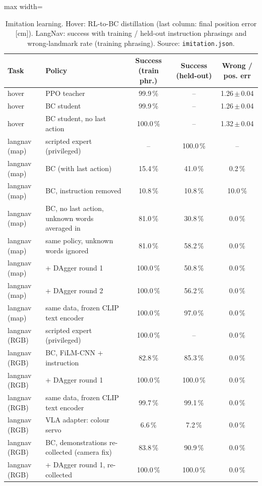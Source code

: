 \begin{table}[!htbp]\centering\small\caption{Imitation learning. Hover: RL-to-BC distillation (last column: final position error [cm]). LangNav: success with training / held-out instruction phrasings and wrong-landmark rate (training phrasing). Source: \texttt{imitation.json}.}\label{tab:fw_il}
\begin{adjustbox}{max width=\linewidth}\begin{tabular}{llccc}\toprule
Task & Policy & Success (train phr.) & Success (held-out) & Wrong / pos. err\\\midrule
hover & PPO teacher & 99.9\,\% & -- & 1.26\,$\pm$\,0.04\\
hover & BC student & 99.9\,\% & -- & 1.26\,$\pm$\,0.04\\
hover & BC student, no last action & 100.0\,\% & -- & 1.32\,$\pm$\,0.04\\
langnav (map) & scripted expert (privileged) & -- & 100.0\,\% & --\\
langnav (map) & BC (with last action) & 15.4\,\% & 41.0\,\% & 0.2\,\%\\
langnav (map) & BC, instruction removed & 10.8\,\% & 10.8\,\% & 10.0\,\%\\
langnav (map) & BC, no last action, unknown words averaged in & 81.0\,\% & 30.8\,\% & 0.0\,\%\\
langnav (map) & same policy, unknown words ignored & 81.0\,\% & 58.2\,\% & 0.0\,\%\\
langnav (map) & + DAgger round 1 & 100.0\,\% & 50.8\,\% & 0.0\,\%\\
langnav (map) & + DAgger round 2 & 100.0\,\% & 56.2\,\% & 0.0\,\%\\
langnav (map) & same data, frozen CLIP text encoder & 100.0\,\% & 97.0\,\% & 0.0\,\%\\
langnav (RGB) & scripted expert (privileged) & 100.0\,\% & -- & 0.0\,\%\\
langnav (RGB) & BC, FiLM-CNN + instruction & 82.8\,\% & 85.3\,\% & 0.0\,\%\\
langnav (RGB) & + DAgger round 1 & 100.0\,\% & 100.0\,\% & 0.0\,\%\\
langnav (RGB) & same data, frozen CLIP text encoder & 99.7\,\% & 99.1\,\% & 0.0\,\%\\
langnav (RGB) & VLA adapter: colour servo & 6.6\,\% & 7.2\,\% & 0.0\,\%\\
langnav (RGB) & BC, demonstrations re-collected (camera fix) & 83.8\,\% & 90.9\,\% & 0.0\,\%\\
langnav (RGB) & + DAgger round 1, re-collected & 100.0\,\% & 100.0\,\% & 0.0\,\%\\

\end{tabular}
\end{adjustbox}
\end{table}
